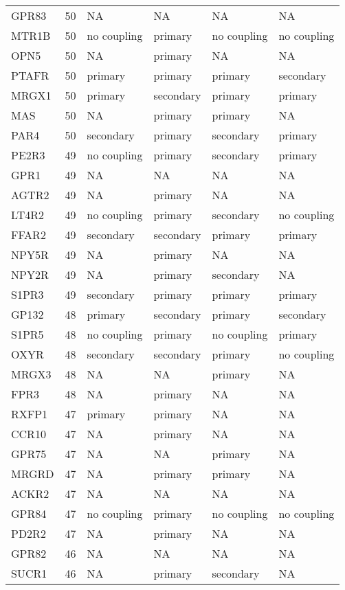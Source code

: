 \begin{longtable}{lrllll}
GPR83 & 50 & NA & NA & NA & NA\\
MTR1B & 50 & no coupling & primary & no coupling & no coupling\\
\addlinespace
OPN5 & 50 & NA & primary & NA & NA\\
PTAFR & 50 & primary & primary & primary & secondary\\
MRGX1 & 50 & primary & secondary & primary & primary\\
MAS & 50 & NA & primary & primary & NA\\
PAR4 & 50 & secondary & primary & secondary & primary\\
\addlinespace
PE2R3 & 49 & no coupling & primary & secondary & primary\\
GPR1 & 49 & NA & NA & NA & NA\\
AGTR2 & 49 & NA & primary & NA & NA\\
LT4R2 & 49 & no coupling & primary & secondary & no coupling\\
FFAR2 & 49 & secondary & secondary & primary & primary\\
\addlinespace
NPY5R & 49 & NA & primary & NA & NA\\
NPY2R & 49 & NA & primary & secondary & NA\\
S1PR3 & 49 & secondary & primary & primary & primary\\
GP132 & 48 & primary & secondary & primary & secondary\\
S1PR5 & 48 & no coupling & primary & no coupling & primary\\
\addlinespace
OXYR & 48 & secondary & secondary & primary & no coupling\\
MRGX3 & 48 & NA & NA & primary & NA\\
FPR3 & 48 & NA & primary & NA & NA\\
RXFP1 & 47 & primary & primary & NA & NA\\
CCR10 & 47 & NA & primary & NA & NA\\
\addlinespace
GPR75 & 47 & NA & NA & primary & NA\\
MRGRD & 47 & NA & primary & primary & NA\\
ACKR2 & 47 & NA & NA & NA & NA\\
GPR84 & 47 & no coupling & primary & no coupling & no coupling\\
PD2R2 & 47 & NA & primary & NA & NA\\
\addlinespace
GPR82 & 46 & NA & NA & NA & NA\\
SUCR1 & 46 & NA & primary & secondary & NA\\

\end{longtable}
